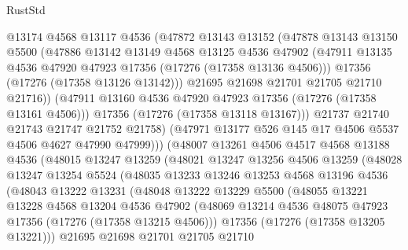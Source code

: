 \begin{lexlean}{RustStd}
\begin{coremodule}
                  @13174
                  @4568
                  @13117
                  @4536
                  (@47872
                    @13143
                    @13152
                    (@47878
                      @13143
                      @13150
                      @5500
                      (@47886
                        @13142
                        @13149
                        @4568
                        @13125
                        @4536
                        @47902
                        (@47911 @13135 @4536 @47920 @47923 @17356 (@17276 (@17358 @13136 @4506)))
                        @17356
                        (@17276 (@17358 @13126 @13142)))
                      @21695
                      @21698
                      @21701
                      @21705
                      @21710
                      @21716))
                  (@47911 @13160 @4536 @47920 @47923 @17356 (@17276 (@17358 @13161 @4506)))
                  @17356
                  (@17276 (@17358 @13118 @13167)))
                @21737
                @21740
                @21743
                @21747
                @21752
                @21758)
              (@47971 @13177 @526 @145 @17 @4506 @5537 @4506 @4627 @47990 @47999)))
          (@48007
            @13261
            @4506
            @4517
            @4568
            @13188
            @4536
            (@48015
              @13247
              @13259
              (@48021
                @13247
                @13256
                @4506
                @13259
                (@48028
                  @13247
                  @13254
                  @5524
                  (@48035
                    @13233
                    @13246
                    @13253
                    @4568
                    @13196
                    @4536
                    (@48043
                      @13222
                      @13231
                      (@48048
                        @13222
                        @13229
                        @5500
                        (@48055
                          @13221
                          @13228
                          @4568
                          @13204
                          @4536
                          @47902
                          (@48069 @13214 @4536 @48075 @47923 @17356 (@17276 (@17358 @13215 @4506)))
                          @17356
                          (@17276 (@17358 @13205 @13221)))
                        @21695
                        @21698
                        @21701
                        @21705
                        @21710

\end{coremodule}
\end{lexlean}
